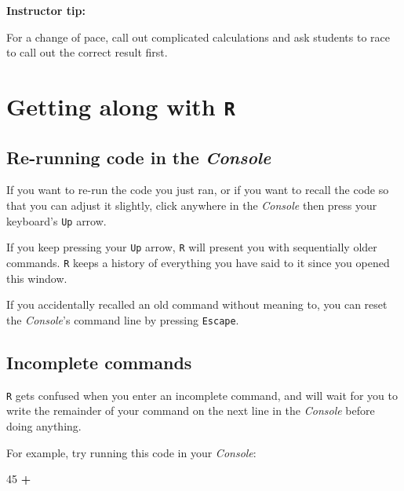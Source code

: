 \documentclass[]{book}
\newenvironment{Shaded}{\begin{snugshade}}{\end{snugshade}}
\newcommand{\DecValTok}[1]{\textcolor[rgb]{0.00,0.00,0.81}{#1}}
\newcommand{\OperatorTok}[1]{\textcolor[rgb]{0.81,0.36,0.00}{\textbf{#1}}}
\begin{document}
\leavevmode\hypertarget{tip-text}{}%
\textbf{Instructor tip:}

For a change of pace, call out complicated calculations and ask students to race to call out the correct result first.

\hypertarget{getting-along-with-r}{%
\section*{\texorpdfstring{Getting along with \texttt{R}}{Getting along with R}}\label{getting-along-with-r}}

\hypertarget{re-running-code-in-the-console}{%
\subsection*{\texorpdfstring{Re-running code in the \emph{Console}}{Re-running code in the Console}}\label{re-running-code-in-the-console}}

If you want to re-run the code you just ran, or if you want to recall the code so that you can adjust it slightly, click anywhere in the \emph{Console} then press your keyboard's \texttt{Up} arrow.

If you keep pressing your \texttt{Up} arrow, \texttt{R} will present you with sequentially older commands. \texttt{R} keeps a history of everything you have said to it since you opened this window.

If you accidentally recalled an old command without meaning to, you can reset the \emph{Console}'s command line by pressing \texttt{Escape}.

\hypertarget{incomplete-commands}{%
\subsection*{Incomplete commands}\label{incomplete-commands}}

\texttt{R} gets confused when you enter an incomplete command, and will wait for you to write the remainder of your command on the next line in the \emph{Console} before doing anything.

For example, try running this code in your \emph{Console}:

\begin{Shaded}
\begin{Highlighting}[]
\DecValTok{45} \OperatorTok{+}
\end{Highlighting}
\end{Shaded}
\end{document}
